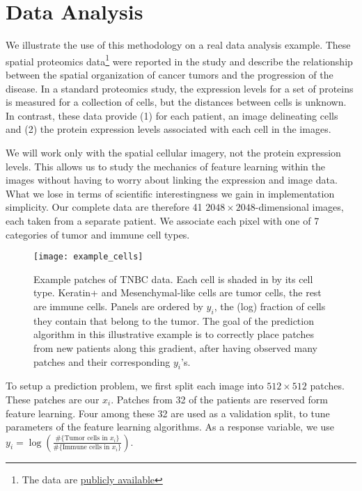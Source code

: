 
\section{Data Analysis}
\label{sec:dataset}

We illustrate the use of this methodology on a real data analysis example. These
spatial proteomics data\footnote{The data are
  \href{https://www.angelolab.com/mibi-data}{publicly available}} were reported
in the study \citep{keren2018structured} and describe the relationship between
the spatial organization of cancer tumors and the progression of the disease. In
a standard proteomics study, the expression levels for a set of proteins is
measured for a collection of cells, but the distances between cells is unknown.
In contrast, these data provide (1) for each patient, an image delineating cells
and (2) the protein expression levels associated with each cell in the images.

We will work only with the spatial cellular imagery, not the protein expression
levels. This allows us to study the mechanics of feature learning within the
images without having to worry about linking the expression and image data. What
we lose in terms of scientific interestingness we gain in implementation
simplicity. Our complete data are therefore 41 $2048 \times 2048$-dimensional
images, each taken from a separate patient. We associate each pixel with one of
7 categories of tumor and immune cell types.

\begin{figure}
  \centering
  \texttt{[image: example\_cells]}
  \caption{Example patches of TNBC data. Each cell is shaded in by its cell
    type. Keratin+ and Mesenchymal-like cells are tumor cells, the rest are
    immune cells. Panels are ordered by $y_i$, the (log) fraction of cells they
    contain that belong to the tumor. The goal of the prediction algorithm in
    this illustrative example is to correctly place patches from new patients
    along this gradient, after having observed many patches and their
    corresponding $y_i$'s.}
  \label{fig:example_cells}
\end{figure}


To setup a prediction problem, we first split each image into $512 \times 512$
patches. These patches are our $x_{i}$. Patches from 32 of the patients are
reserved form feature learning. Four among these 32 are used as a validation
split, to tune parameters of the feature learning algorithms. As a response
variable, we use $y_{i} = \log\left(\frac{\#\{\text{Tumor cells in }x_{i}\}}{\#\{\text{Immune cells in }x_i\}}\right)$.

